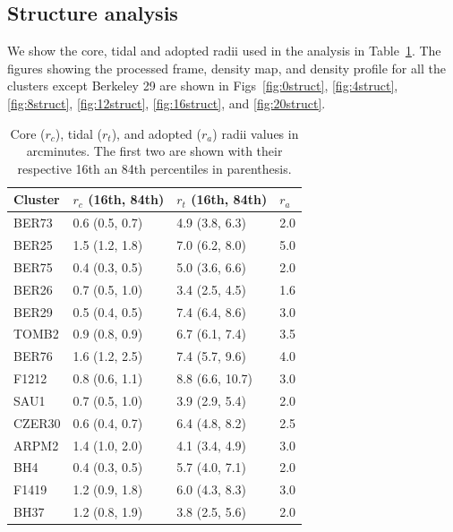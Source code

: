 \documentclass[draft]{aa}
\begin{document}
\begin{appendix}

\FloatBarrier
\section{Structure analysis}
 \label{app:struct_analysis}

 We show the core, tidal and adopted radii used in the analysis in
 Table~\ref{tab:radii}. The figures showing the processed frame, density map,
 and density profile for all the clusters except Berkeley 29 are shown in
 Figs~\ref{fig:0struct}, \ref{fig:4struct}, \ref{fig:8struct}, 
 \ref{fig:12struct}, \ref{fig:16struct}, and \ref{fig:20struct}.

 \begin{table}[h!]
 \caption{Core ($r_{c}$), tidal ($r_{t}$), and adopted ($r_{a}$) radii values
 in arcminutes. The first two are shown with their respective 16th an 84th
 percentiles in parenthesis.}
 \label{tab:radii}
 \centering
 \begin{tabular}{llll}
 \hline\hline
 Cluster & $r_{c}$ (16th, 84th) &  $r_{t}$ (16th, 84th) & $r_{a}$\\
 \hline
  BER73         & 0.6 (0.5, 0.7) &  4.9 (3.8, 6.3) &  2.0\\
  BER25         & 1.5 (1.2, 1.8) &  7.0 (6.2, 8.0) &  5.0\\
  BER75         & 0.4 (0.3, 0.5) &  5.0 (3.6, 6.6) &  2.0\\
  BER26         & 0.7 (0.5, 1.0) &  3.4 (2.5, 4.5) &  1.6\\
  BER29         & 0.5 (0.4, 0.5) &  7.4 (6.4, 8.6) &  3.0\\
  TOMB2         & 0.9 (0.8, 0.9) &  6.7 (6.1, 7.4) &  3.5\\
  BER76         & 1.6 (1.2, 2.5) &  7.4 (5.7, 9.6) &  4.0\\
  F1212         & 0.8 (0.6, 1.1) &  8.8 (6.6, 10.7) & 3.0\\
  SAU1          & 0.7 (0.5, 1.0) &  3.9 (2.9, 5.4) &  2.0\\
  CZER30        & 0.6 (0.4, 0.7) &  6.4 (4.8, 8.2) &  2.5\\
  ARPM2         & 1.4 (1.0, 2.0) &  4.1 (3.4, 4.9) &  3.0\\
  BH4           & 0.4 (0.3, 0.5) &  5.7 (4.0, 7.1) &  2.0\\
  F1419         & 1.2 (0.9, 1.8) &  6.0 (4.3, 8.3) &  3.0\\
  BH37          & 1.2 (0.8, 1.9) &  3.8 (2.5, 5.6) &  2.0\\

\end{tabular}
\end{table}
\end{appendix}
\end{document}
